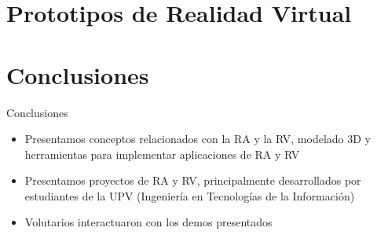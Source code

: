 \documentclass[aspectratio=169,compress]{beamer}
\begin{document}


\section[PRV]{Prototipos de Realidad Virtual}

%

%













\section[CP1]{Conclusiones}
\begin{frame}{Conclusiones}
\begin{itemize}
\item Presentamos conceptos relacionados con la RA y la RV, modelado 3D y herramientas para implementar aplicaciones de RA y RV
\item Presentamos proyectos de RA y RV, principalmente desarrollados por estudiantes de la UPV (Ingenier\'ia en Tecnolog\'ias de la Informaci\'on)
\item Volutarios interactuaron con los demos presentados
\end{itemize}
\end{frame}
\end{document}
